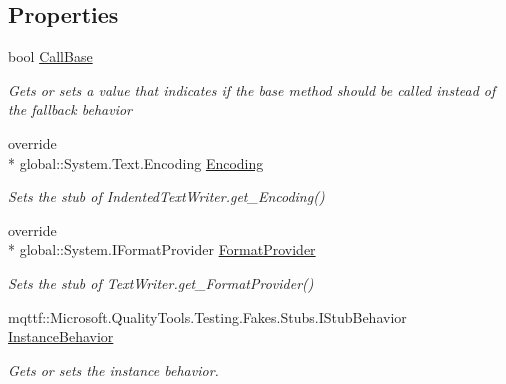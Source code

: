 \subsection*{Properties}
\begin{DoxyCompactItemize}
\item 
bool \hyperlink{class_system_1_1_code_dom_1_1_compiler_1_1_fakes_1_1_stub_indented_text_writer_a80256ca9d86ed4f8b85bde55bd28cf11}{Call\-Base}
\begin{DoxyCompactList}\small\item\em Gets or sets a value that indicates if the base method should be called instead of the fallback behavior\end{DoxyCompactList}\item 
override \\*
global\-::\-System.\-Text.\-Encoding \hyperlink{class_system_1_1_code_dom_1_1_compiler_1_1_fakes_1_1_stub_indented_text_writer_a71eb838137d6d134c19bc76f77fbdcf8}{Encoding}
\begin{DoxyCompactList}\small\item\em Sets the stub of Indented\-Text\-Writer.\-get\-\_\-\-Encoding()\end{DoxyCompactList}\item 
override \\*
global\-::\-System.\-I\-Format\-Provider \hyperlink{class_system_1_1_code_dom_1_1_compiler_1_1_fakes_1_1_stub_indented_text_writer_a418625e060326caab6830b7d7fe489a2}{Format\-Provider}
\begin{DoxyCompactList}\small\item\em Sets the stub of Text\-Writer.\-get\-\_\-\-Format\-Provider()\end{DoxyCompactList}\item 
mqttf\-::\-Microsoft.\-Quality\-Tools.\-Testing.\-Fakes.\-Stubs.\-I\-Stub\-Behavior \hyperlink{class_system_1_1_code_dom_1_1_compiler_1_1_fakes_1_1_stub_indented_text_writer_accdcf274a54b850ac33271a175d69175}{Instance\-Behavior}
\begin{DoxyCompactList}\small\item\em Gets or sets the instance behavior.\end{DoxyCompactList}\item 

\end{DoxyCompactItemize}
